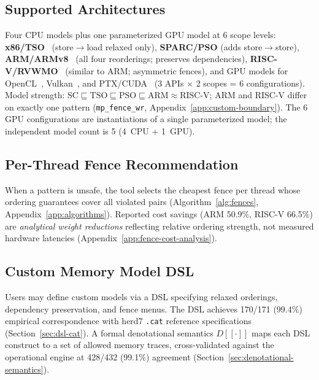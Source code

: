 \documentclass[11pt]{article}
\begin{document}
\subsection{Supported Architectures}

Four CPU models plus one parameterized GPU model at 6 scope levels:
\textbf{x86/TSO}~\cite{OwensSarkarSewell2009} (store$\to$load relaxed only),
\textbf{SPARC/PSO} (adds store$\to$store),
\textbf{ARM/ARMv8}~\cite{Pulte2018} (all four reorderings; preserves
dependencies),
\textbf{RISC-V/RVWMO}~\cite{RISCV2019} (similar to ARM; asymmetric fences),
and GPU models for OpenCL~\cite{Sorensen2016},
Vulkan~\cite{KhronosVulkan}, and PTX/CUDA~\cite{Lustig2019}
(3 APIs $\times$ 2 scopes = 6 configurations).
Model strength: $\text{SC} \sqsubseteq \text{TSO} \sqsubseteq \text{PSO}
\sqsubseteq \text{ARM} \approx \text{RISC-V}$;
ARM and RISC-V differ on exactly one pattern (\texttt{mp\_fence\_wr},
Appendix~\ref{app:custom-boundary}).
The 6 GPU configurations are instantiations of a single parameterized
model; the independent model count is 5 (4~CPU + 1~GPU).

\subsection{Per-Thread Fence Recommendation}

When a pattern is unsafe, the tool selects the cheapest fence per
thread whose ordering guarantees cover all violated pairs
(Algorithm~\ref{alg:fences}, Appendix~\ref{app:algorithms}).
Reported cost savings (ARM 50.9\%, RISC-V 66.5\%) are \emph{analytical
weight reductions} reflecting relative ordering strength, not measured
hardware latencies (Appendix~\ref{app:fence-cost-analysis}).

\subsection{Custom Memory Model DSL}

Users may define custom models via a DSL specifying relaxed orderings,
dependency preservation, and fence menus. The DSL achieves 170/171
(99.4\%) empirical correspondence with herd7 \texttt{.cat} reference
specifications (Section~\ref{sec:dsl-cat}).
A formal denotational semantics $D[\![\cdot]\!]$ maps each DSL construct
to a set of allowed memory traces, cross-validated against the operational
engine at 428/432 (99.1\%) agreement (Section~\ref{sec:denotational-semantics}).

\end{document}
